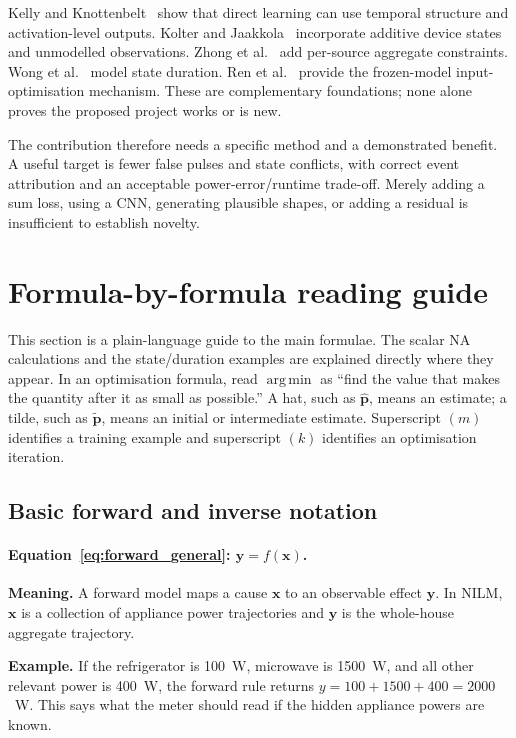 \documentclass[11pt]{article}
\newcommand{\vect}[1]{\mathbf{#1}}
\begin{document}
Kelly and Knottenbelt~\cite{kelly2015} show that direct learning can use temporal structure and activation-level outputs. Kolter and Jaakkola~\cite{kolter2012} incorporate additive device states and unmodelled observations. Zhong et al.~\cite{zhong2014} add per-source aggregate constraints. Wong et al.~\cite{wong2014} model state duration. Ren et al.~\cite{ren2020} provide the frozen-model input-optimisation mechanism. These are complementary foundations; none alone proves the proposed project works or is new.

The contribution therefore needs a specific method and a demonstrated benefit. A useful target is fewer false pulses and state conflicts, with correct event attribution and an acceptable power-error/runtime trade-off. Merely adding a sum loss, using a CNN, generating plausible shapes, or adding a residual is insufficient to establish novelty.

\section{Formula-by-formula reading guide}

This section is a plain-language guide to the main formulae. The scalar NA calculations and the state/duration examples are explained directly where they appear. In an optimisation formula, read $\operatorname*{arg\,min}$ as ``find the value that makes the quantity after it as small as possible.'' A hat, such as $\hat{\vect{p}}$, means an estimate; a tilde, such as $\tilde{\vect{p}}$, means an initial or intermediate estimate. Superscript $(m)$ identifies a training example and superscript $(k)$ identifies an optimisation iteration.

\subsection{Basic forward and inverse notation}

\paragraph{Equation~\eqref{eq:forward_general}: $\vect{y}=f(\vect{x})$.}
\textbf{Meaning.} A forward model maps a cause $\vect{x}$ to an observable effect $\vect{y}$. In NILM, $\vect{x}$ is a collection of appliance power trajectories and $\vect{y}$ is the whole-house aggregate trajectory.

\textbf{Example.} If the refrigerator is 100~W, microwave is 1500~W, and all other relevant power is 400~W, the forward rule returns $y=100+1500+400=2000$~W. This says what the meter should read if the hidden appliance powers are known.
\end{document}
